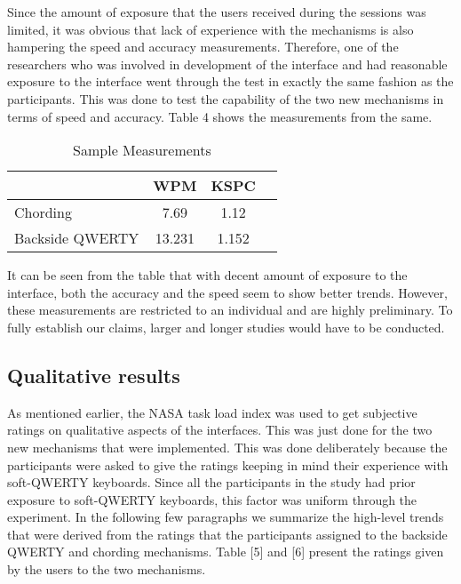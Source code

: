 Since the amount of exposure that the users received during the
sessions was limited, it was obvious that lack of experience with the
mechanisms is also hampering the speed and accuracy
measurements. Therefore, one of the researchers who was involved in
development of the interface and had reasonable exposure to the
interface went through the test in exactly the same fashion as the
participants. This was done to test the capability of the two new
mechanisms in terms of speed and accuracy. Table 4 shows the
measurements from the same.

\begin{table*}
	\centering
		\begin{tabular}{|l|c|c|c|} \hline
		                         & WPM & KSPC \\ \hline
			 Chording & 7.69 & 1.12 \\ \hline
			 Backside QWERTY & 13.231 & 1.152 \\ \hline
		\end{tabular}
	\caption{Sample Measurements}
	\label{tab:StatisticsForTextCorpora}
\end{table*}

It can be seen from the table that with decent amount of exposure to
the interface, both the accuracy and the speed seem to show better
trends. However, these measurements are restricted to an individual
and are highly preliminary. To fully establish our claims, larger and
longer studies would have to be conducted.

\subsection{Qualitative results}

As mentioned earlier, the NASA task load index was used to get
subjective ratings on qualitative aspects of the interfaces. This was
just done for the two new mechanisms that were implemented. This was
done deliberately because the participants were asked to give the
ratings keeping in mind their experience with soft-QWERTY
keyboards. Since all the participants in the study had prior exposure
to soft-QWERTY keyboards, this factor was uniform through the
experiment. In the following few paragraphs we summarize the
high-level trends that were derived from the ratings that the
participants assigned to the backside QWERTY and chording
mechanisms. Table [5] and [6] present the ratings given by the users
to the two mechanisms.

